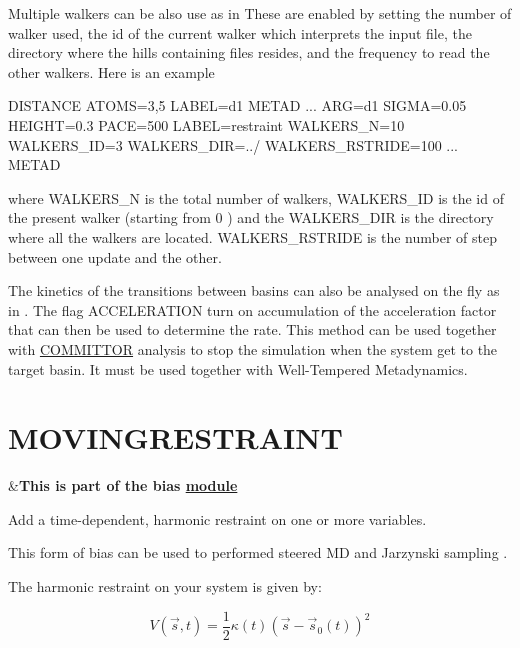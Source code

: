 \begin{DoxyParagraph}{}
Multiple walkers can be also use as in \cite{multiplewalkers} These are enabled by setting the number of walker used, the id of the current walker which interprets the input file, the directory where the hills containing files resides, and the frequency to read the other walkers. Here is an example \begin{DoxyVerb}DISTANCE ATOMS=3,5 LABEL=d1
METAD ...
   ARG=d1 SIGMA=0.05 HEIGHT=0.3 PACE=500 LABEL=restraint 
   WALKERS_N=10
   WALKERS_ID=3
   WALKERS_DIR=../
   WALKERS_RSTRIDE=100
... METAD
\end{DoxyVerb}
 where W\+A\+L\+K\+E\+R\+S\+\_\+\+N is the total number of walkers, W\+A\+L\+K\+E\+R\+S\+\_\+\+I\+D is the id of the present walker (starting from 0 ) and the W\+A\+L\+K\+E\+R\+S\+\_\+\+D\+I\+R is the directory where all the walkers are located. W\+A\+L\+K\+E\+R\+S\+\_\+\+R\+S\+T\+R\+I\+D\+E is the number of step between one update and the other.
\end{DoxyParagraph}
\begin{DoxyParagraph}{}
The kinetics of the transitions between basins can also be analysed on the fly as in \cite{PRL230602}. The flag A\+C\+C\+E\+L\+E\+R\+A\+T\+I\+O\+N turn on accumulation of the acceleration factor that can then be used to determine the rate. This method can be used together with \hyperlink{COMMITTOR}{C\+O\+M\+M\+I\+T\+T\+O\+R} analysis to stop the simulation when the system get to the target basin. It must be used together with Well-\/\+Tempered Metadynamics. 
\end{DoxyParagraph}
\hypertarget{MOVINGRESTRAINT}{}\section{M\+O\+V\+I\+N\+G\+R\+E\+S\+T\+R\+A\+I\+N\+T}\label{MOVINGRESTRAINT}
\begin{TabularC}{2}
\hline
&{\bfseries  This is part of the bias \hyperlink{mymodules}{module }}   \\
\end{TabularC}
Add a time-\/dependent, harmonic restraint on one or more variables.

This form of bias can be used to performed steered M\+D \cite{Grubmuller3} and Jarzynski sampling \cite{jarzynski}.

The harmonic restraint on your system is given by\+:

\[ V(\vec{s},t) = \frac{1}{2} \kappa(t) ( \vec{s} - \vec{s}_0(t) )^2 \]

